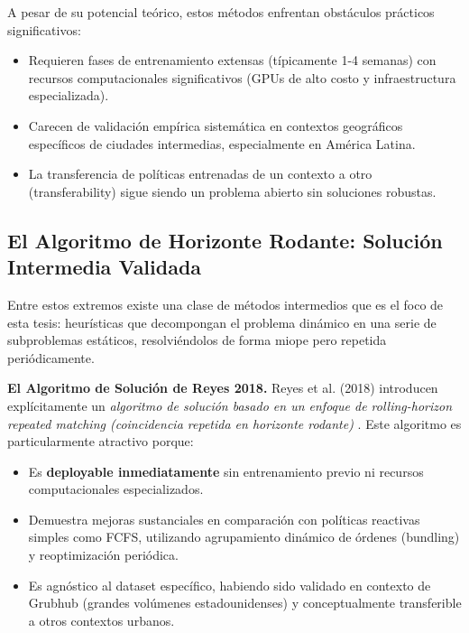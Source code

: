 A pesar de su potencial teórico, estos métodos enfrentan obstáculos prácticos 
significativos:

\begin{itemize}
    \item Requieren fases de entrenamiento extensas (típicamente 1-4 semanas) 
    con recursos computacionales significativos (GPUs de alto costo y 
    infraestructura especializada).
    
    \item Carecen de validación empírica sistemática en contextos geográficos 
    específicos de ciudades intermedias, especialmente en América Latina.
    
    \item La transferencia de políticas entrenadas de un contexto a otro 
    (transferability) sigue siendo un problema abierto sin soluciones robustas.
\end{itemize}

\subsection{El Algoritmo de Horizonte Rodante: Solución Intermedia Validada}

Entre estos extremos existe una clase de métodos intermedios que es el foco 
de esta tesis: heurísticas que decompongan el problema dinámico en una serie 
de subproblemas estáticos, resolviéndolos de forma miope pero repetida 
periódicamente.

\textbf{El Algoritmo de Solución de Reyes 2018.} Reyes et al. (2018) introducen 
explícitamente un \textit{algoritmo de solución basado en un enfoque de 
rolling-horizon repeated matching (coincidencia repetida en horizonte rodante)} 
\cite{Reyes2018}. Este algoritmo es particularmente atractivo porque:

\begin{itemize}
    \item Es \textbf{deployable inmediatamente} sin entrenamiento previo ni 
    recursos computacionales especializados.
    
    \item Demuestra mejoras sustanciales en comparación con políticas reactivas 
    simples como FCFS, utilizando agrupamiento dinámico de órdenes (bundling) 
    y reoptimización periódica.
    
    \item Es agnóstico al dataset específico, habiendo sido validado en 
    contexto de Grubhub (grandes volúmenes estadounidenses) y conceptualmente 
    transferible a otros contextos urbanos.
\end{itemize}

